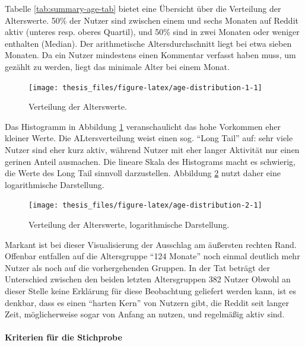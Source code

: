 \documentclass[11pt,a4paper,twoside]{article}
\let\oldpar\paragraph
\renewcommand{\paragraph}{\oldpar*}
\begin{document}
Tabelle \ref{tab:summary-age-tab} bietet eine Übersicht über die
Verteilung der Alterswerte. 50\% der Nutzer sind zwischen einem und
sechs Monaten auf Reddit aktiv (unteres resp. oberes Quartil), und 50\%
sind in zwei Monaten oder weniger enthalten (Median). Der arithmetische
Altersdurchschnitt liegt bei etwa sieben Monaten. Da ein Nutzer
mindestens einen Kommentar verfasst haben muss, um gezählt zu werden,
liegt das minimale Alter bei einem Monat.

\begin{figure}

{\centering \texttt{[image: thesis\_files/figure-latex/age-distribution-1-1]} 

}

\caption{Verteilung der Alterswerte.}\label{fig:age-distribution-1}
\end{figure}

Das Histogramm in Abbildung \ref{fig:age-distribution-1} veranschaulicht
das hohe Vorkommen eher kleiner Werte. Die ALtersverteilung weist einen
sog. \enquote{Long Tail} auf: sehr viele Nutzer sind eher kurz aktiv,
während Nutzer mit eher langer Aktivität nur einen gerinen Anteil
ausmachen. Die lineare Skala des Histograms macht es schwierig, die
Werte des Long Tail sinnvoll darzustellen. Abbildung
\ref{fig:age-distribution-2} nutzt daher eine logarithmische
Darstellung.

\begin{figure}

{\centering \texttt{[image: thesis\_files/figure-latex/age-distribution-2-1]} 

}

\caption{Verteilung der Alterswerte, logarithmische Darstellung.}\label{fig:age-distribution-2}
\end{figure}

Markant ist bei dieser Visualisierung der Ausschlag am äußersten rechten
Rand. Offenbar entfallen auf die Altersgruppe \enquote{124 Monate} noch
einmal deutlich mehr Nutzer als noch auf die vorhergehenden Gruppen. In
der Tat beträgt der Unterschied zwischen den beiden letzten
Altersgruppen 382 Nutzer Obwohl an dieser Stelle keine Erklärung für
diese Beobachtung geliefert werden kann, ist es denkbar, dass es einen
\enquote{harten Kern} von Nutzern gibt, die Reddit seit langer Zeit,
möglicherweise sogar von Anfang an nutzen, und regelmäßig aktiv sind.

\hypertarget{kriterien}{%
\paragraph{Kriterien für die Stichprobe}\label{kriterien}}
\end{document}
